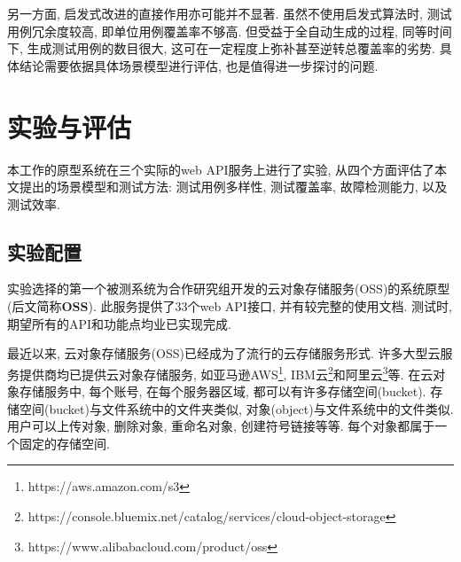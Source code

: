         另一方面, 启发式改进的直接作用亦可能并不显著. 虽然不使用启发式算法时, 测试用例冗余度较高, 即单位用例覆盖率不够高. 但受益于全自动生成的过程, 同等时间下, 生成测试用例的数目很大, 这可在一定程度上弥补甚至逆转总覆盖率的劣势. 具体结论需要依据具体场景模型进行评估, 也是值得进一步探讨的问题.
    

    \section{实验与评估}

        \label{sec:experiment}

        本工作的原型系统在三个实际的web API服务上进行了实验, 从四个方面评估了本文提出的场景模型和测试方法: 测试用例多样性, 测试覆盖率, 故障检测能力, 以及测试效率.
    
        \subsection{实验配置}
            实验选择的第一个被测系统为合作研究组开发的云对象存储服务(OSS)的系统原型(后文简称\textbf{OSS}). 此服务提供了33个web API接口, 并有较完整的使用文档. 测试时, 期望所有的API和功能点均业已实现完成.
            
            最近以来, 云对象存储服务(OSS)已经成为了流行的云存储服务形式. 许多大型云服务提供商均已提供云对象存储服务, 如亚马逊AWS\footnote{https://aws.amazon.com/s3}, IBM云\footnote{ https://console.bluemix.net/catalog/services/cloud-object-storage}和阿里云\footnote{ https://www.alibabacloud.com/product/oss}等. 在云对象存储服务中, 每个账号, 在每个服务器区域, 都可以有许多存储空间(bucket). 存储空间(bucket)与文件系统中的文件夹类似, 对象(object)与文件系统中的文件类似. 用户可以上传对象, 删除对象, 重命名对象, 创建符号链接等等. 每个对象都属于一个固定的存储空间.
            
